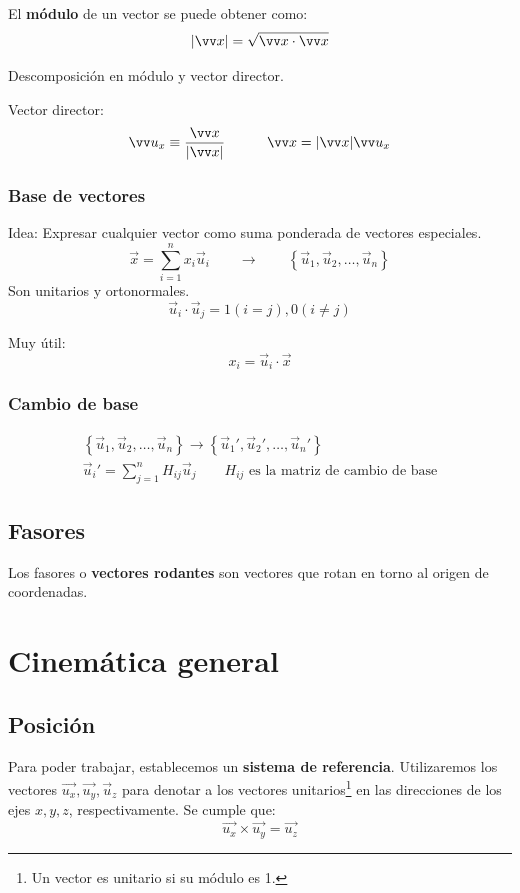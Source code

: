 \documentclass[a4paper]{book}
\begin{document}
El \textbf{módulo} de un vector se puede obtener como: \[\abs{\vec{x}}=\sqrt{\vec{x}\cdot \vec{x}}\]

Descomposición en módulo y vector director.

Vector director: \[\vec{u_x}\equiv \frac{\vec{x}}{\abs{\vec{x}}} \qquad \quad \vec{x} = \abs{\vec{x}}\vec{u_x}\]

\subsubsection{Base de vectores}
Idea: Expresar cualquier vector como suma ponderada de vectores especiales. \[\vec{x} = \sum^{n}_{i=1}{x_i\vec{u}_i}\qquad \longrightarrow \qquad \left\lbrace \vec{u}_1,\vec{u}_2,\ldots ,\vec{u}_n \right\rbrace\]
Son unitarios y ortonormales. \[\vec{u}_i\cdot \vec{u}_j =1 (i=j), 0(i\not =j)\]

Muy útil: \[x_i = \vec{u}_i \cdot \vec{x}\]

\subsubsection{Cambio de base}
\[\begin{split}
		\left\lbrace \vec{u}_1,\vec{u}_2,\ldots ,\vec{u}_n \right\rbrace \longrightarrow \left\lbrace \vec{u}_1',\vec{u}_2',\ldots ,\vec{u}_n' \right\rbrace \\  \vec{u}_i' = \sum^{n}_{j=1}{H_{ij}\vec{u}_j} \qquad H_{ij} \text{ es la matriz de cambio de base}
	\end{split}\]

\subsection{Fasores} \label{subsec:fasores}
Los fasores o \textbf{vectores rodantes} son vectores que rotan en torno al origen de coordenadas.
\section{Cinemática general}


\subsection{Posición}
Para poder trabajar, establecemos un \textbf{sistema de referencia}. Utilizaremos los vectores $\vec{u_x}, \vec{u_y}, \vec{u}_z$ para denotar a los vectores unitarios\footnote{Un vector es unitario si su módulo es 1.} en las direcciones de los ejes $x, y, z$, respectivamente. Se cumple que: \[\vec{u_x} \times \vec{u_y} = \vec{u_z} \]
\end{document}
